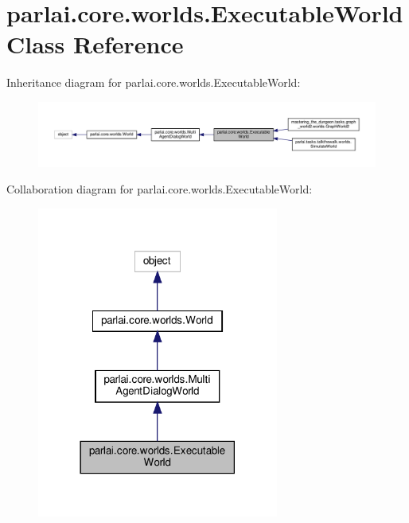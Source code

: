 \hypertarget{classparlai_1_1core_1_1worlds_1_1ExecutableWorld}{}\section{parlai.\+core.\+worlds.\+Executable\+World Class Reference}
\label{classparlai_1_1core_1_1worlds_1_1ExecutableWorld}


Inheritance diagram for parlai.\+core.\+worlds.\+Executable\+World\+:
\nopagebreak
\begin{figure}[H]
\begin{center}
\leavevmode
\includegraphics[width=350pt]{classparlai_1_1core_1_1worlds_1_1ExecutableWorld__inherit__graph}
\end{center}
\end{figure}


Collaboration diagram for parlai.\+core.\+worlds.\+Executable\+World\+:
\nopagebreak
\begin{figure}[H]
\begin{center}
\leavevmode
\includegraphics[width=225pt]{classparlai_1_1core_1_1worlds_1_1ExecutableWorld__coll__graph}
\end{center}
\end{figure}
